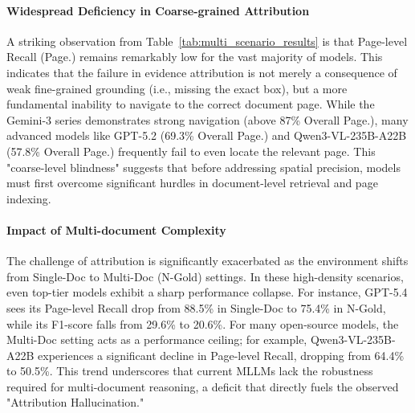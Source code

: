 \documentclass[]{opendatalab}
\newcommand{\highlightgreen}[1]{\colorbox[HTML]{d3ff9f}{\textbf{#1}}}
\newcommand{\highlightblue}[1]{\colorbox[HTML]{bae6fb}{\textbf{#1}}}
\begin{document}
{{{\paragraph{Widespread Deficiency in Coarse-grained Attribution} A striking observation from Table~\ref{tab:multi_scenario_results} is that Page-level Recall (Page.) remains remarkably low for the vast majority of models. This indicates that the failure in evidence attribution is not merely a consequence of weak fine-grained grounding (i.e., missing the exact box), but a more fundamental inability to navigate to the correct document page. While the Gemini-3 series demonstrates strong navigation (above 87\% Overall Page.), many advanced models like GPT-5.2 (69.3\% Overall Page.) and Qwen3-VL-235B-A22B (57.8\% Overall Page.) frequently fail to even locate the relevant page. This "coarse-level blindness" suggests that before addressing spatial precision, models must first overcome significant hurdles in document-level retrieval and page indexing.

\paragraph{Impact of Multi-document Complexity} The challenge of attribution is significantly exacerbated as the environment shifts from Single-Doc to Multi-Doc (N-Gold) settings. In these high-density scenarios, even top-tier models exhibit a sharp performance collapse. For instance, GPT-5.4 sees its Page-level Recall drop from 88.5\% in Single-Doc to 75.4\% in N-Gold, while its F1-score falls from 29.6\% to 20.6\%. For many open-source models, the Multi-Doc setting acts as a performance ceiling; for example, Qwen3-VL-235B-A22B experiences a significant decline in Page-level Recall, dropping from 64.4\% to 50.5\%. This trend underscores that current MLLMs lack the robustness required for multi-document reasoning, a deficit that directly fuels the observed "Attribution Hallucination."

\begin{table}[htbp]
\centering
\scriptsize
\renewcommand{\arraystretch}{1.25}
\setlength{\tabcolsep}{1.0pt}
\caption{Detailed attribution performance of MLLMs across different document scenarios. Page. denotes Page-level Recall; Rec., Prec., and F1 represent bounding-box-level Recall, Precision, and F1-score respectively. For each metric, the best and second-best results are highlighted in \highlightblue{blue} and \highlightgreen{green}, respectively.}
\label{tab:multi_scenario_results}


\end{table}}}}
\end{document}
